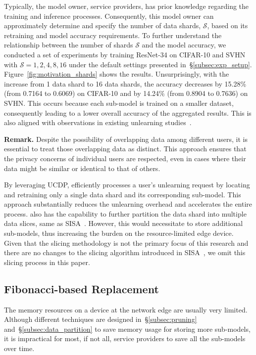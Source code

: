 \documentclass[conference,compsoc]{IEEEtran}
\begin{document}
Typically, the model owner, \eg service providers, has prior knowledge regarding the training and inference processes. Consequently, this model owner can approximately determine and specify the number of data shards, \ie $\mathcal{S}$, based on its retraining and model accuracy requirements. To further understand the relationship between the number of shards $\mathcal{S}$ and the model accuracy, we conducted a set of experiments by training ResNet-34 on CIFAR-10 and SVHN with $\mathcal{S}=1, 2, 4, 8, 16$ under the default settings presented in~\S\ref{subsec:exp_setup}. Figure~\ref{fig:motivation_shards} shows the results. Unsurprisingly, with the increase from 1 data shard to 16 data shards, the accuracy decreases by 15.28\% (from 0.7164 to 0.6069) on CIFAR-10 and by 14.24\% (from 0.8904 to 0.7636) on SVHN. This occurs because each sub-model is trained on a smaller dataset, consequently leading to a lower overall accuracy of the aggregated results. This is also aligned with observations in existing unlearning studies~\cite{bourtoule2021machine, yan2022arcane}.

\smallskip
\noindent\textbf{Remark.} Despite the possibility of overlapping data among different users, it is essential to treat those overlapping data as distinct. This approach ensures that the privacy concerns of individual users are respected, even in cases where their data might be similar or identical to that of others.

By leveraging UCDP, \tool efficiently processes a user's unlearning request by locating and retraining only a single data shard and its corresponding sub-model. This approach substantially reduces the unlearning overhead and accelerates the entire process.
\tool also has the capability to further partition the data shard into multiple data slices, same as SISA~\cite{bourtoule2021machine}. However, this would necessitate \tool to store additional sub-models, thus increasing the burden on the resource-limited edge device. Given that the slicing methodology is not the primary focus of this research and there are no changes to the slicing algorithm introduced in SISA~\cite{bourtoule2021machine}, we omit this slicing process in this paper.




\subsection{Fibonacci-based Replacement}
\label{subsec:replacement}


The memory resources on a device at the network edge are usually very limited. Although different techniques are designed in~\S\ref{subsec:pruning} and~\S\ref{subsec:data_partition} to save memory usage for storing more sub-models, it is impractical for most, if not all, service providers to save all the sub-models over time. 
\end{document}
